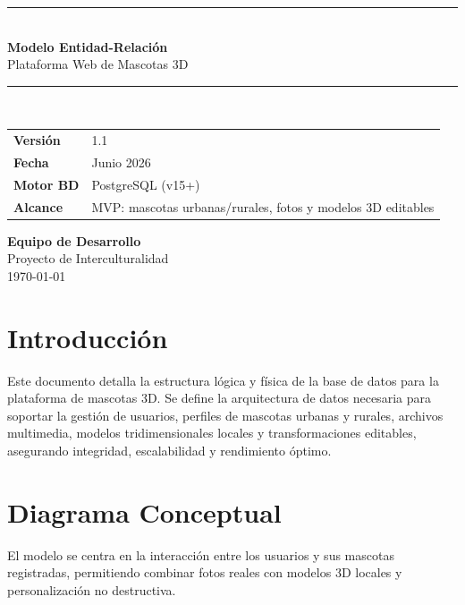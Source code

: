 \documentclass[12pt,a4paper]{article}
\renewcommand{\arraystretch}{1.5}
\begin{document}
\begin{titlepage}
    \centering
    \vspace*{2cm}
    {\color{PrimaryBlue}\rule{\textwidth}{1.5pt}}\\[0.5cm]
    {\Huge \textbf{\color{PrimaryBlue} Modelo Entidad-Relación}}\\[0.2cm]
    {\LARGE \textsf{Plataforma Web de Mascotas 3D}}\\[0.5cm]
    {\color{PrimaryBlue}\rule{\textwidth}{1.5pt}}\\[2cm]

    \begin{minipage}{0.8\textwidth}
        \centering
        \large
        \renewcommand{\arraystretch}{1.8}
        \begin{tabularx}{\textwidth}{L L}
             \textbf{Versión} & 1.1 \\
            \textbf{Fecha} & Junio 2026 \\
             \textbf{Motor BD} & PostgreSQL (v15+) \\
            \textbf{Alcance} & MVP: mascotas urbanas/rurales, fotos y modelos 3D editables \\
        \end{tabularx}
    \end{minipage}

    \vfill
    {\large \textbf{Equipo de Desarrollo}\\[0.2cm] Proyecto de Interculturalidad}\\[0.5cm]
    {\small \today}
\end{titlepage}

\newpage
\tableofcontents
\newpage

\section{Introducción}
Este documento detalla la estructura lógica y física de la base de datos para la plataforma de mascotas 3D. Se define la arquitectura de datos necesaria para soportar la gestión de usuarios, perfiles de mascotas urbanas y rurales, archivos multimedia, modelos tridimensionales locales y transformaciones editables, asegurando integridad, escalabilidad y rendimiento óptimo.

\section{Diagrama Conceptual}
El modelo se centra en la interacción entre los usuarios y sus mascotas registradas, permitiendo combinar fotos reales con modelos 3D locales y personalización no destructiva.
\end{document}
